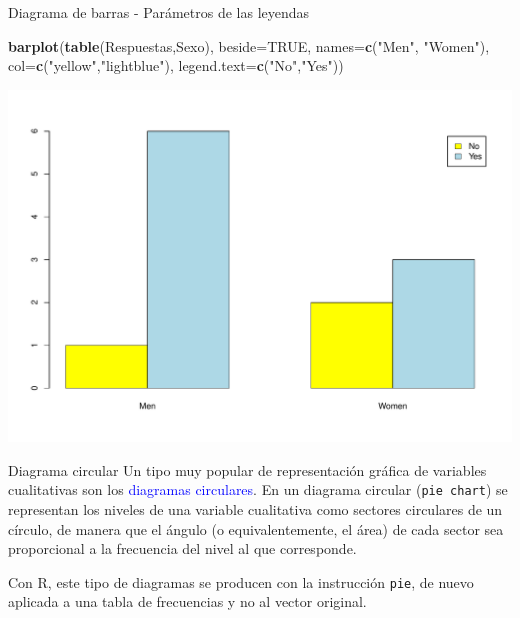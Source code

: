\documentclass[
  ignorenonframetext,
]{beamer}
\newenvironment{Shaded}{\begin{snugshade}}{\end{snugshade}}
\newcommand{\AttributeTok}[1]{\textcolor[rgb]{0.13,0.29,0.53}{#1}}
\newcommand{\ConstantTok}[1]{\textcolor[rgb]{0.56,0.35,0.01}{#1}}
\newcommand{\FunctionTok}[1]{\textcolor[rgb]{0.13,0.29,0.53}{\textbf{#1}}}
\newcommand{\NormalTok}[1]{#1}
\newcommand{\StringTok}[1]{\textcolor[rgb]{0.31,0.60,0.02}{#1}}
\newcommand\blue[1]{\textcolor{blue}{#1}}
\begin{document}
\begin{frame}[fragile]{Diagrama de barras - Parámetros de las leyendas}
\label{diagrama-de-barras---paruxe1metros-de-las-leyendas}
\begin{Shaded}
\begin{Highlighting}[]
\FunctionTok{barplot}\NormalTok{(}\FunctionTok{table}\NormalTok{(Respuestas,Sexo), }\AttributeTok{beside=}\ConstantTok{TRUE}\NormalTok{, }\AttributeTok{names=}\FunctionTok{c}\NormalTok{(}\StringTok{"Men"}\NormalTok{, }\StringTok{"Women"}\NormalTok{), }
        \AttributeTok{col=}\FunctionTok{c}\NormalTok{(}\StringTok{"yellow"}\NormalTok{,}\StringTok{"lightblue"}\NormalTok{), }\AttributeTok{legend.text=}\FunctionTok{c}\NormalTok{(}\StringTok{"No"}\NormalTok{,}\StringTok{"Yes"}\NormalTok{))}
\end{Highlighting}
\end{Shaded}

\includegraphics{R_base_files/figure-beamer/unnamed-chunk-91-1.pdf}
\end{frame}

\begin{frame}[fragile]{Diagrama circular}
\label{diagrama-circular}
Un tipo muy popular de representación gráfica de variables cualitativas
son los \blue{diagramas circulares}. En un diagrama circular
(\texttt{pie\ chart}) se representan los niveles de una variable
cualitativa como sectores circulares de un círculo, de manera que el
ángulo (o equivalentemente, el área) de cada sector sea proporcional a
la frecuencia del nivel al que corresponde.

Con R, este tipo de diagramas se producen con la instrucción
\texttt{pie}, de nuevo aplicada a una tabla de frecuencias y no al
vector original.
\end{frame}
\end{document}
